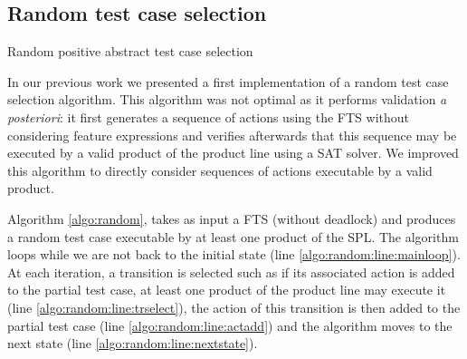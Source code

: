 \subsection{Random test case selection}

\begin{algorithm}[t]
	\caption{Random positive abstract test case selection}
 \label{algo:random}
\end{algorithm}

In our previous work \cite{Devroey2014c} we presented a first implementation of a random test case selection algorithm. This algorithm was not optimal as it performs validation \textit{a posteriori}: it first generates a sequence of actions using the FTS without considering feature expressions and verifies afterwards that this sequence may be executed by a valid product of the product line using a SAT solver. We improved this algorithm to directly consider sequences of actions executable by a valid product. 

Algorithm \ref{algo:random}, takes as input a FTS (without deadlock) and produces a random test case executable by at least one product of the SPL. The algorithm loops while we are not back to the initial state (line \ref{algo:random:line:mainloop}). At each iteration, a transition is selected such as if its associated action is added to the partial test case, at least one product of the product line may execute it (line \ref{algo:random:line:trselect}), the action of this transition is then added to the partial test case (line \ref{algo:random:line:actadd}) and the algorithm moves to the next state (line \ref{algo:random:line:nextstate}).

